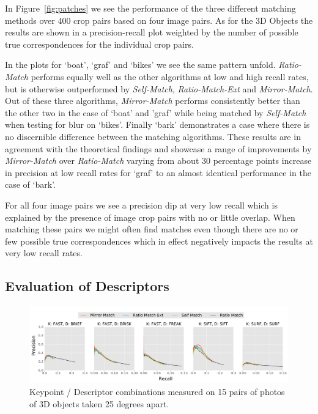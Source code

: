\documentclass[review]{elsarticle}
\begin{document}
In Figure~\ref{fig:patches} we see the performance of the three different matching methods over 400 crop pairs based on four image pairs. As for the 3D Objects the results are shown in a precision-recall plot weighted by the number of possible true correspondences for the individual crop pairs.

In the plots for `boat', `graf' and `bikes' we see the same pattern unfold. \emph{Ratio-Match} performs equally well as the other algorithms at low and high recall rates, but is otherwise outperformed by \emph{Self-Match}, \emph{Ratio-Match-Ext} and \emph{Mirror-Match}. Out of these three algorithms, \emph{Mirror-Match} performs consistently better than the other two in the case of `boat' and 'graf' while being matched by \emph{Self-Match} when testing for blur on `bikes'. Finally `bark' demonstrates a case where there is no discernible difference between the matching algorithms. These results are in agreement with the theoretical findings and showcase a range of improvements by \emph{Mirror-Match} over \emph{Ratio-Match} varying from about 30 percentage points increase in precision at low recall rates for `graf' to an almost identical performance in the case of `bark'.

For all four image pairs we see a precision dip at very low recall which is explained by the presence of image crop pairs with no or little overlap. When matching these pairs we might often find matches even though there are no or few possible true correspondences which in effect negatively impacts the results at very low recall rates.

\subsection{Evaluation of Descriptors}
\label{label:desc}

\begin{figure}[t]
    \centering
    \includegraphics[width=\columnwidth]{images/results_descriptors_imageset1}
    \caption{Keypoint / Descriptor combinations measured on 15 pairs of 
    photos of 3D objects taken 25 degrees apart.}
    \label{fig:descriptors}
\end{figure}
\end{document}
